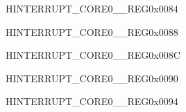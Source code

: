 \begin{register}{H}{INTERRUPT\_CORE0\_\_REG}{0x0084}\label{regdesc:INTERRUPTCORE0DMACH0INTMAPREG}






\end{register}\vspace{-3em}


































\begin{register}{H}{INTERRUPT\_CORE0\_\_REG}{0x0088}\label{regdesc:INTERRUPTCORE0SHAINTMAPREG}






\end{register}\vspace{-3em}


\begin{register}{H}{INTERRUPT\_CORE0\_\_REG}{0x008C}\label{regdesc:INTERRUPTCORE0ECCINTMAPREG}






\end{register}\vspace{-3em}


\begin{register}{H}{INTERRUPT\_CORE0\_\_REG}{0x0090}\label{regdesc:INTERRUPTCORE0CPUINTRFROMCPU0MAPREG}






\end{register}\vspace{-3em}


\begin{register}{H}{INTERRUPT\_CORE0\_\_REG}{0x0094}\label{regdesc:INTERRUPTCORE0CPUINTRFROMCPU1MAPREG}






\end{register}\vspace{-3em}


